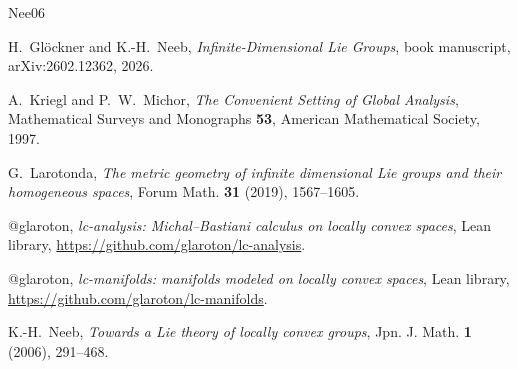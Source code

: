\begin{thebibliography}{Nee06}

H.~Glöckner and K.-H.~Neeb, \emph{Infinite-Dimensional Lie Groups}, book manuscript,
arXiv:2602.12362, 2026.

A.~Kriegl and P.~W.~Michor, \emph{The Convenient Setting of Global Analysis}, Mathematical
Surveys and Monographs \textbf{53}, American Mathematical Society, 1997.

G.~Larotonda, \emph{The metric geometry of infinite dimensional Lie groups and their
homogeneous spaces}, Forum Math. \textbf{31} (2019), 1567--1605.

@glaroton, \emph{lc-analysis: Michal--Bastiani calculus on locally convex spaces}, Lean
library, \url{https://github.com/glaroton/lc-analysis}.

@glaroton, \emph{lc-manifolds: manifolds modeled on locally convex spaces}, Lean library,
\url{https://github.com/glaroton/lc-manifolds}.

K.-H.~Neeb, \emph{Towards a Lie theory of locally convex groups}, Jpn. J. Math. \textbf{1}
(2006), 291--468.

\end{thebibliography}
